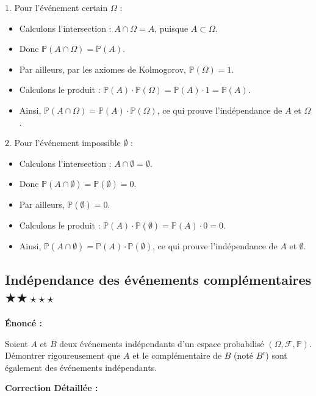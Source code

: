\documentclass[11pt,a4paper]{article}
\begin{document}
1. \textit{}Pour l'événement certain $\Omega$ :\textit{}
\begin{itemize}
\item Calculons l'intersection : $A \cap \Omega = A$, puisque $A \subset \Omega$.
\item Donc $\mathbb{P}(A \cap \Omega) = \mathbb{P}(A)$.
\item Par ailleurs, par les axiomes de Kolmogorov, $\mathbb{P}(\Omega) = 1$.
\item Calculons le produit : $\mathbb{P}(A) \cdot \mathbb{P}(\Omega) = \mathbb{P}(A) \cdot 1 = \mathbb{P}(A)$.
\item Ainsi, $\mathbb{P}(A \cap \Omega) = \mathbb{P}(A) \cdot \mathbb{P}(\Omega)$, ce qui prouve l'indépendance de $A$ et $\Omega$.
\end{itemize}2. \textit{}Pour l'événement impossible $\emptyset$ :\textit{}
\begin{itemize}
\item Calculons l'intersection : $A \cap \emptyset = \emptyset$.
\item Donc $\mathbb{P}(A \cap \emptyset) = \mathbb{P}(\emptyset) = 0$.
\item Par ailleurs, $\mathbb{P}(\emptyset) = 0$.
\item Calculons le produit : $\mathbb{P}(A) \cdot \mathbb{P}(\emptyset) = \mathbb{P}(A) \cdot 0 = 0$.
\item Ainsi, $\mathbb{P}(A \cap \emptyset) = \mathbb{P}(A) \cdot \mathbb{P}(\emptyset)$, ce qui prouve l'indépendance de $A$ et $\emptyset$.
\end{itemize}

\subsection*{ Indépendance des événements complémentaires \quad $\bigstar\bigstar\star\star\star$}

\textbf{Énoncé :}

Soient $A$ et $B$ deux événements indépendants d'un espace probabilisé $(\Omega, \mathcal{F}, \mathbb{P})$.
Démontrer rigoureusement que $A$ et le complémentaire de $B$ (noté $B^c$) sont également des événements indépendants.

\textbf{Correction Détaillée :}
\end{document}
